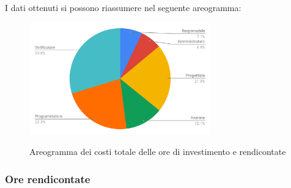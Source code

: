 I dati ottenuti si possono riassumere nel seguente areogramma:
\begin{figure}[H] 
			\centering 
				\includegraphics[width=0.7\textwidth]{res/images/areogramma_riepilogo.pdf}\\
				\caption{Areogramma dei costi totale delle ore di investimento e rendicontate}
			\label{AreogrammaRiepilogoRuoli}
\end{figure}


\subsubsection{Ore rendicontate}
